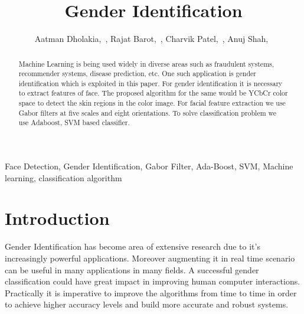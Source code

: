 \documentclass[journal]{IEEEtran}
\begin{document}
	\title{Gender Identification}
	
	\author{Aatman Dholakia,~,
		Rajat Barot,~,
		Charvik Patel,~, 
		Anuj Shah,~}
	
	
	
	
	\maketitle
	
	
	\begin{abstract}
		Machine Learning is being used widely in diverse areas such as fraudulent systems, recommender systems, disease prediction, etc. One such application is gender identification which is exploited in this paper. For gender identification it is necessary to extract features of face. The proposed algorithm for the same would be YCbCr color space to detect the skin regions in the color image. For facial feature extraction we use Gabor filters at five scales and eight orientations. To solve classification problem we use Adaboost, SVM based classifier.
	\end{abstract}
	\begin{IEEEkeywords}
		Face Detection, Gender Identification, Gabor Filter, Ada-Boost, SVM, Machine learning, classification algorithm
	\end{IEEEkeywords}
	
	
	\IEEEpeerreviewmaketitle
	
	
	
	\section{\textbf{Introduction}}
	Gender Identification has become area of extensive research due to it's increasingly powerful applications. Moreover augmenting it in real time scenario can be useful in many applications in many fields. A successful gender classification could have great impact in improving human computer interactions. Practically it is imperative to improve the algorithms from time to time in order to achieve higher accuracy levels and build more accurate and robust systems.
	
	
	
	
	
	
	
	\ifCLASSOPTIONcaptionsoff
	\newpage
	\fi
	
	
	
\end{document}
